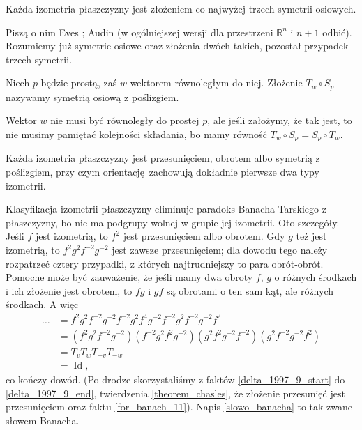 
\begin{theorem}[Chasles'a, 1830]
%
\label{theorem_chasles}
    Każda izometria płaszczyzny jest złożeniem co najwyżej trzech symetrii osiowych.
\end{theorem}

Piszą o nim Eves \cite[s. 113]{eves1_1972}; Audin \cite[s. 49]{audin_2003} (w ogólniejszej wersji dla przestrzeni $\mathbb R^n$ i $n+1$ odbić).
Rozumiemy już symetrie osiowe oraz złożenia dwóch takich, pozostał przypadek trzech symetrii.

\begin{definition}
    Niech $p$ będzie prostą, zaś $w$ wektorem równoległym do niej.
    Złożenie $T_w \circ S_p$ nazywamy symetrią osiową z poślizgiem.
\end{definition}

Wektor $w$ nie musi być równoległy do prostej $p$, ale jeśli założymy, że tak jest, to nie musimy pamiętać kolejności składania, bo mamy równość $T_w \circ S_p = S_p \circ T_w$.

\begin{corollary}
    Każda izometria płaszczyzny jest przesunięciem, obrotem albo symetrią z poślizgiem, przy czym orientację zachowują dokładnie pierwsze dwa typy izometrii.
\end{corollary}

Klasyfikacja izometrii płaszczyzny eliminuje paradoks Banacha-Tarskiego z płaszczyzny, bo nie ma podgrupy wolnej w grupie jej izometrii.
Oto szczegóły.
Jeśli $f$ jest izometrią, to $f^2$ jest przesunięciem albo obrotem.
Gdy $g$ też jest izometrią, to $f^2g^2f^{-2}g^{-2}$ jest zawsze przesunięciem; dla dowodu tego należy rozpatrzeć cztery przypadki, z których najtrudniejszy to para obrót-obrót.
Pomocne może być zauważenie, że jeśli mamy dwa obroty $f$, $g$ o różnych środkach i ich złożenie jest obrotem, to $fg$ i $gf$ są obrotami o ten sam kąt, ale różnych środkach.
A więc 
\begin{align}
    \ldots & = f^2 g^2 f^{-2} g^{-2} f^{-2} g^2 f^4 g^{-2} f^{-2} g^2 f^{-2} g^{-2} f^2 \label{slowo_banacha} \\
    & = (f^2 g^2 f^{-2} g^{-2})( f^{-2} g^2 f^2 g^{-2}) (g^2 f^2g^{-2} f^{-2} ) (g^2 f^{-2} g^{-2} f^2) \\
    & = T_v T_w T_{-v} T_{-w} \\
    & = \operatorname{Id},
\end{align}
co kończy dowód.
(Po drodze skorzystaliśmy z faktów \ref{delta_1997_9_start} do \ref{delta_1997_9_end}, twierdzenia \ref{theorem_chasles}, że złożenie przesunięć jest przesunięciem oraz faktu \ref{for_banach_11}).
Napis \ref{slowo_banacha} to tak zwane słowem Banacha.

